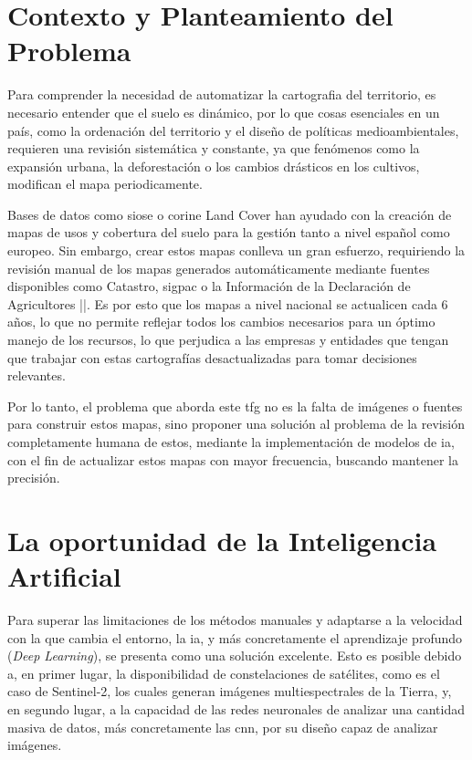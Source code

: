 \section{Contexto y Planteamiento del Problema}
\label{sec:contexto_problema}

Para comprender la necesidad de automatizar la cartografia del territorio, es necesario entender que el suelo es dinámico, por lo que cosas esenciales
en un país, como la ordenación del territorio y el diseño de políticas medioambientales, requieren una revisión sistemática y constante, ya que
fenómenos como la expansión urbana, la deforestación o los cambios drásticos en los cultivos, modifican el mapa periodicamente.


Bases de datos como \acrshort{siose} o \acrshort{corine} Land Cover han ayudado con la creación de mapas de usos y cobertura del suelo para la gestión
tanto a nivel español como europeo. Sin embargo, crear estos mapas conlleva un gran esfuerzo, requiriendo la revisión manual de los mapas generados 
automáticamente mediante fuentes disponibles como Catastro, \acrfull{sigpac} o la Información de la Declaración de Agricultores |\citet{siose.es}|.
Es por esto que los mapas a nivel nacional se actualicen cada 6 años, lo que no permite reflejar todos los cambios necesarios para un óptimo
manejo de los recursos, lo que perjudica a las empresas y entidades que tengan que trabajar con estas cartografías desactualizadas para tomar decisiones relevantes.


Por lo tanto, el problema que aborda este \acrshort{tfg} no es la falta de imágenes o fuentes para construir estos mapas, sino proponer una solución
al problema de la revisión completamente humana de estos, mediante la implementación de modelos de \acrshort{ia}, con el fin de actualizar estos
mapas con mayor frecuencia, buscando mantener la precisión.

\section{La oportunidad de la Inteligencia Artificial}
\label{sec:oportunidad_ia}

Para superar las limitaciones de los métodos manuales y adaptarse a la velocidad con la que cambia el entorno, la \acrshort{ia}, y más concretamente
el aprendizaje profundo (\textit{Deep Learning}), se presenta como una solución excelente. Esto es posible debido a, en primer lugar, la disponibilidad
de constelaciones de satélites, como es el caso de Sentinel-2, los cuales generan imágenes multiespectrales de la Tierra, y, en segundo lugar,
a la capacidad de las redes neuronales de analizar una cantidad masiva de datos, más concretamente las \acrshort{cnn}, por su diseño capaz de
analizar imágenes. 


